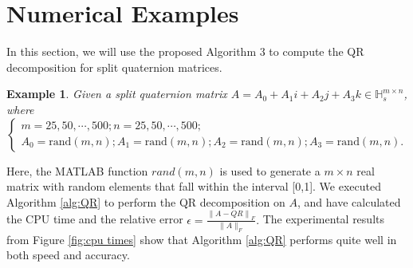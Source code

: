 \documentclass[3p]{elsarticle}
\newtheorem{example}[theorem]{Example}
\numberwithin{equation}{section}
\begin{document}
\section{Numerical Examples}

In this section,  we will use the proposed  Algorithm 3 to compute the QR decomposition for split quaternion matrices.
\begin{example}
    Given a split quaternion matrix $A = A_{0}+A_{1}i+A_{2}j+A_{3}k\in \mathbb{H}_s^{m\times n}$, where
    \begin{equation}
       \begin{cases}
            m = 25,50,\cdots,500;
            n = 25,50,\cdots,500;  \\
            A_{0}=\text{rand}(m,n);
            A_{1}=\text{rand}(m,n); 
            A_{2}=\text{rand}(m,n);
            A_{3}=\text{rand}(m,n).
        \end{cases} \label{eq:example2}
    \end{equation}
\end{example}
Here, the MATLAB function $rand(m,n)$ is used to generate a $m \times n$ real matrix with random elements that fall within the interval [0,1]. We executed Algorithm \ref{alg:QR} to perform the QR decomposition on $A$, and have calculated the CPU time and the relative error
$\epsilon = \frac{\left\|A - Q R\right\|_{F}}{\|A\|_{F}}.$
The experimental results from Figure \ref{fig:cpu times} show that Algorithm \ref{alg:QR} performs quite well in both speed and accuracy. 
\end{document}
